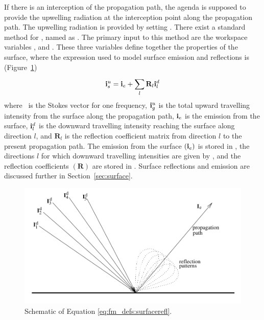 If there is an interception of the propagation path, the agenda
 is supposed to provide the upwelling
radiation at the interception point along the propagation path. The
upwelling radiation is provided by setting . There exist
a standard method for , named as
. The primary input to this method are the
workspace variables ,
 and . These
three variables define together the properties of the surface, where
the expression used to model surface emission and reflections is
(Figure~\ref{fig:fm_defs:surface_refl})
\begin{equation}
  \mathbf{i}_s^u = \mathbf{i}_e + \sum_l^{} \mathbf{R}_l \mathbf{i}_l^d
  \label{eq:fm_defs:surfacerefl}
\end{equation}
where \MpiVct\ is the Stokes vector for one frequency, $\mathbf{i}_g^u$
is the total upward travelling intensity from the surface along the
propagation path, $\mathbf{i}_e$ is the emission from the surface,
$\mathbf{i}_l^d$ is the downward travelling intensity reaching the
surface along direction $l$, and $\mathbf{R}_l$ is the reflection
coefficient matrix from direction $l$ to the present propagation path.
The emission from the surface $(\mathbf{i}_e)$ is stored in
, the directions $l$ for which downward
travelling intensities are given by , and the
reflection coefficients $(\mathbf{R})$ are stored in
. Surface reflections and emission are
discussed further in Section~\ref{sec:surface}.

\begin{figure}[!p]
 \begin{center}
  \includegraphics*[width=0.95\hsize]{Figs/fm_definitions/ground_refl}
  \caption{Schematic of Equation \ref{eq:fm_defs:surfacerefl}.}
  \label{fig:fm_defs:surface_refl}
 \end{center}
\end{figure}

